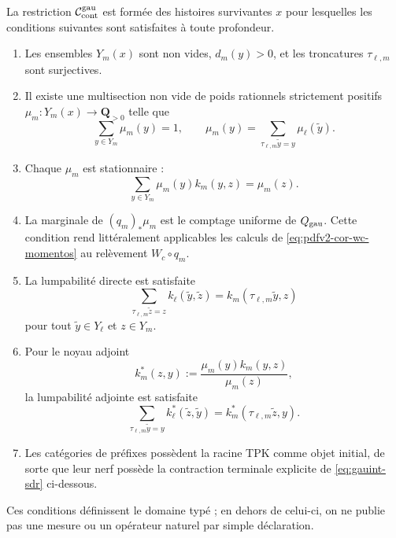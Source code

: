 La restriction \(\mathcal C_{\rm cont}^{\rm gau}\) est formée des
histoires survivantes \(x\) pour lesquelles les conditions
suivantes sont satisfaites à toute profondeur.
\begin{enumerate}
 \item Les ensembles \(Y_m(x)\) sont non vides, \(d_m(y)>0\), et les
 troncatures \(\tau_{\ell,m}\) sont surjectives.
 \item Il existe une multisection non vide de poids rationnels strictement
 positifs \(\mu_m:Y_m(x)\to\mathbf Q_{>0}\) telle que
 \begin{equation}\label{eq:gauint-medida-proyectiva}
  \sum_{y\in Y_m}\mu_m(y)=1,
  \qquad
  \mu_m(y)=\sum_{\tau_{\ell,m}\widetilde y=y}\mu_\ell(\widetilde y).
 \end{equation}
 \item Chaque \(\mu_m\) est stationnaire :
 \begin{equation}\label{eq:gauint-estacionariedad}
  \sum_{y\in Y_m}\mu_m(y)k_m(y,z)=\mu_m(z).
 \end{equation}
 \item La marginale de \((q_m)_*\mu_m\) est le comptage uniforme de
 \(Q_{\rm gau}\). Cette condition rend littéralement applicables les calculs
 de \eqref{eq:pdfv2-cor-wc-momentos} au relèvement \(W_c\circ q_m\).
 \item La lumpabilité directe est satisfaite
 \begin{equation}\label{eq:gauint-lump-directa}
  \sum_{\tau_{\ell,m}\widetilde z=z}
   k_\ell(\widetilde y,\widetilde z)
  =k_m(\tau_{\ell,m}\widetilde y,z)
 \end{equation}
 pour tout \(\widetilde y\in Y_\ell\) et \(z\in Y_m\).
 \item Pour le noyau adjoint
 \begin{equation}\label{eq:gauint-kernel-adjunto}
  k_m^*(z,y):=\frac{\mu_m(y)k_m(y,z)}{\mu_m(z)},
 \end{equation}
 la lumpabilité adjointe est satisfaite
 \begin{equation}\label{eq:gauint-lump-adjunta}
  \sum_{\tau_{\ell,m}\widetilde y=y}
   k_\ell^*(\widetilde z,\widetilde y)
  =k_m^*(\tau_{\ell,m}\widetilde z,y).
 \end{equation}
 \item Les catégories de préfixes possèdent la racine TPK comme objet initial,
 de sorte que leur nerf possède la contraction terminale explicite de
 \eqref{eq:gauint-sdr} ci-dessous.
\end{enumerate}
Ces conditions définissent le domaine typé ; en dehors de celui-ci, on ne publie pas une
mesure ou un opérateur naturel par simple déclaration.

